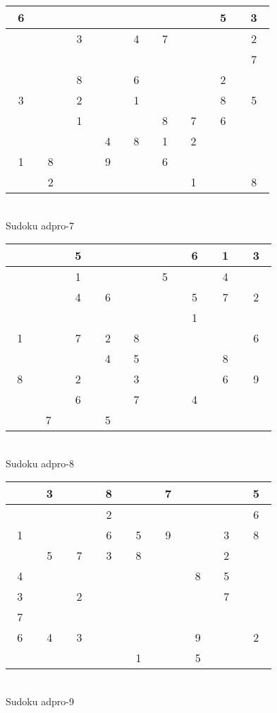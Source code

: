 \documentclass[12pt,a4paper]{article}
\begin{document}
\vfill
\begin{center}
\begin{tabular}{||c|c|c||c|c|c||c|c|c||}\hline\hline
~6~&~ ~&~ ~&~ ~&~ ~&~ ~&~ ~&~5~&~3~\\\hline
~ ~&~ ~&~3~&~ ~&~4~&~7~&~ ~&~ ~&~2~\\\hline
~ ~&~ ~&~ ~&~ ~&~ ~&~ ~&~ ~&~ ~&~7~\\\hline
\hline
~ ~&~ ~&~8~&~ ~&~6~&~ ~&~ ~&~2~&~ ~\\\hline
~3~&~ ~&~2~&~ ~&~1~&~ ~&~ ~&~8~&~5~\\\hline
~ ~&~ ~&~1~&~ ~&~ ~&~8~&~7~&~6~&~ ~\\\hline
\hline
~ ~&~ ~&~ ~&~4~&~8~&~1~&~2~&~ ~&~ ~\\\hline
~1~&~8~&~ ~&~9~&~ ~&~6~&~ ~&~ ~&~ ~\\\hline
~ ~&~2~&~ ~&~ ~&~ ~&~ ~&~1~&~ ~&~8~\\\hline
\hline\end{tabular}\\[1.5ex]
Sudoku adpro-7
\end{center}
\vfill
\begin{center}
\begin{tabular}{||c|c|c||c|c|c||c|c|c||}\hline\hline
~ ~&~ ~&~5~&~ ~&~ ~&~ ~&~6~&~1~&~3~\\\hline
~ ~&~ ~&~1~&~ ~&~ ~&~5~&~ ~&~4~&~ ~\\\hline
~ ~&~ ~&~4~&~6~&~ ~&~ ~&~5~&~7~&~2~\\\hline
\hline
~ ~&~ ~&~ ~&~ ~&~ ~&~ ~&~1~&~ ~&~ ~\\\hline
~1~&~ ~&~7~&~2~&~8~&~ ~&~ ~&~ ~&~6~\\\hline
~ ~&~ ~&~ ~&~4~&~5~&~ ~&~ ~&~8~&~ ~\\\hline
\hline
~8~&~ ~&~2~&~ ~&~3~&~ ~&~ ~&~6~&~9~\\\hline
~ ~&~ ~&~6~&~ ~&~7~&~ ~&~4~&~ ~&~ ~\\\hline
~ ~&~7~&~ ~&~5~&~ ~&~ ~&~ ~&~ ~&~ ~\\\hline
\hline\end{tabular}\\[1.5ex]
Sudoku adpro-8
\end{center}
\vfill
\begin{center}
\begin{tabular}{||c|c|c||c|c|c||c|c|c||}\hline\hline
~ ~&~3~&~ ~&~8~&~ ~&~7~&~ ~&~ ~&~5~\\\hline
~ ~&~ ~&~ ~&~2~&~ ~&~ ~&~ ~&~ ~&~6~\\\hline
~1~&~ ~&~ ~&~6~&~5~&~9~&~ ~&~3~&~8~\\\hline
\hline
~ ~&~5~&~7~&~3~&~8~&~ ~&~ ~&~2~&~ ~\\\hline
~4~&~ ~&~ ~&~ ~&~ ~&~ ~&~8~&~5~&~ ~\\\hline
~3~&~ ~&~2~&~ ~&~ ~&~ ~&~ ~&~7~&~ ~\\\hline
\hline
~7~&~ ~&~ ~&~ ~&~ ~&~ ~&~ ~&~ ~&~ ~\\\hline
~6~&~4~&~3~&~ ~&~ ~&~ ~&~9~&~ ~&~2~\\\hline
~ ~&~ ~&~ ~&~ ~&~1~&~ ~&~5~&~ ~&~ ~\\\hline
\hline\end{tabular}\\[1.5ex]
Sudoku adpro-9
\end{center}
\end{document}
